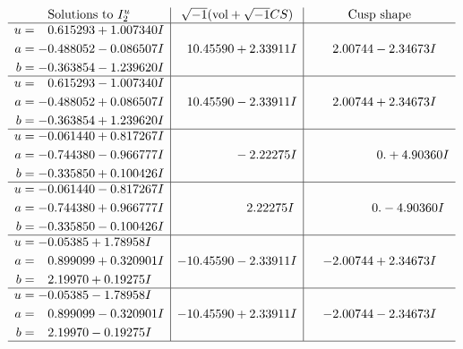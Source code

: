\documentclass[1p]{elsarticle_modified}
\theoremstyle{definition}
\newcommand{\I}{\sqrt{-1}}
\begin{document}
$$\begin{array}{c|c|c}  
\text{Solutions to }I^u_{2}& \I (\text{vol} + \sqrt{-1}CS) & \text{Cusp shape}\\
 \hline 
\begin{aligned}
u &= \phantom{-}0.615293 + 1.007340 I \\
a &= -0.488052 - 0.086507 I \\
b &= -0.363854 - 1.239620 I\end{aligned}
 & \phantom{-}10.45590 + 2.33911 I & \phantom{-}2.00744 - 2.34673 I \\ \hline\begin{aligned}
u &= \phantom{-}0.615293 - 1.007340 I \\
a &= -0.488052 + 0.086507 I \\
b &= -0.363854 + 1.239620 I\end{aligned}
 & \phantom{-}10.45590 - 2.33911 I & \phantom{-}2.00744 + 2.34673 I \\ \hline\begin{aligned}
u &= -0.061440 + 0.817267 I \\
a &= -0.744380 - 0.966777 I \\
b &= -0.335850 + 0.100426 I\end{aligned}
 & \phantom{-0.000000 } -2.22275 I & \phantom{-0.000000 -}0. + 4.90360 I \\ \hline\begin{aligned}
u &= -0.061440 - 0.817267 I \\
a &= -0.744380 + 0.966777 I \\
b &= -0.335850 - 0.100426 I\end{aligned}
 & \phantom{-0.000000 -}2.22275 I & \phantom{-0.000000 } 0. - 4.90360 I \\ \hline\begin{aligned}
u &= -0.05385 + 1.78958 I \\
a &= \phantom{-}0.899099 + 0.320901 I \\
b &= \phantom{-}2.19970 + 0.19275 I\end{aligned}
 & -10.45590 - 2.33911 I & -2.00744 + 2.34673 I \\ \hline\begin{aligned}
u &= -0.05385 - 1.78958 I \\
a &= \phantom{-}0.899099 - 0.320901 I \\
b &= \phantom{-}2.19970 - 0.19275 I\end{aligned}
 & -10.45590 + 2.33911 I & -2.00744 - 2.34673 I\\
 \hline 
 \end{array}$$\newpage\newpage\renewcommand{\arraystretch}{1}
\end{document}
